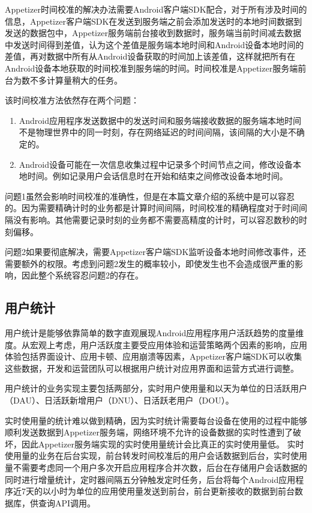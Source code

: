 Appetizer时间校准的解决办法需要Android客户端SDK配合，对于所有涉及时间的信息，Appetizer客户端SDK在发送到服务端之前会添加发送时的本地时间数据到发送的数据包中，Appetizer服务端前台接收到数据时，服务端当前时间减去数据中发送时间得到差值，认为这个差值是服务端本地时间和Android设备本地时间的差值，再对数据中所有从Android设备获取的时间加上该差值，这样就把所有在Android设备本地获取的时间校准到服务端的时间。时间校准是Appetizer服务端前台为数不多计算量稍大的任务。

该时间校准方法依然存在两个问题：

\begin{enumerate}
	\item Android应用程序发送数据中的发送时间和服务端接收数据的服务端本地时间不是物理世界中的同一时刻，存在网络延迟的时间间隔，该间隔的大小是不确定的。
	\item Android设备可能在一次信息收集过程中记录多个时间节点之间，修改设备本地时间。例如记录用户会话信息时在开始和结束之间修改设备本地时间。
\end{enumerate} 

问题1虽然会影响时间校准的准确性，但是在本篇文章介绍的系统中是可以容忍的。因为需要精确计时的业务都是计算时间间隔，时间校准的精确程度对于时间间隔没有影响。其他需要记录时刻的业务都不需要高精度的计时，可以容忍数秒的时刻偏移。

问题2如果要彻底解决，需要Appetizer客户端SDK监听设备本地时间修改事件，还需要额外的权限。考虑到问题2发生的概率较小，即使发生也不会造成很严重的影响，因此整个系统容忍问题2的存在。

\subsection{用户统计}
\label{subsec:usercomputing}

用户统计是能够依靠简单的数字直观展现Android应用程序用户活跃趋势的度量维度。从宏观上考虑，用户活跃度主要受应用体验和运营策略两个因素的影响，应用体验包括界面设计、应用卡顿、应用崩溃等因素，Appetizer客户端SDK可以收集这些数据，开发和运营团队可以根据用户统计对应用界面和运营方式进行调整。

用户统计的业务实现主要包括两部分，实时用户使用量和以天为单位的日活跃用户（DAU）、日活跃新增用户（DNU）、日活跃老用户（DOU）。

实时使用量的统计难以做到精确，因为实时统计需要每台设备在使用的过程中能够顺利发送数据到Appetizer服务端，网络环境不允许的设备数据的实时性遭到了破坏，因此Appetizer服务端实现的实时使用量统计会比真正的实时使用量低。
实时使用量的业务在后台实现，前台转发时间校准后的用户会话数据到后台，实时使用量不需要考虑同一个用户多次开启应用程序合并次数，后台在存储用户会话数据的同时进行增量统计，定时器间隔五分钟触发定时任务，后台将每个Android应用程序近7天的以小时为单位的应用使用量发送到前台，前台更新接收的数据到前台数据库，供查询API调用。

